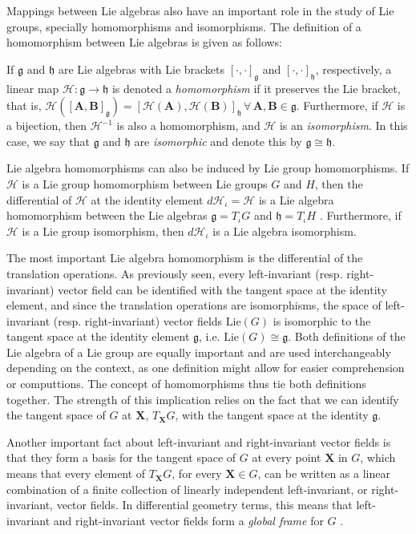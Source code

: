 Mappings between Lie algebras also have an important role in the study of Lie groups, specially homomorphisms and isomorphisms. The definition of a homomorphism between Lie algebras is given as follows:
\begin{definition}
    If $\mathfrak{g}$ and $\mathfrak{h}$ are Lie algebras with Lie brackets $[\cdot, \cdot]_\mathfrak{g}$ and $[\cdot, \cdot]_\mathfrak{h}$, respectively, a linear map $\mathscr{H}:\mathfrak{g}\to\mathfrak{h}$ is denoted a \emph{homomorphism} if it preserves the Lie bracket, that is, $\mathscr{H}([\mathbf{A}, \mathbf{B}]_\mathfrak{g}) = [\mathscr{H}(\mathbf{A}), \mathscr{H}(\mathbf{B})]_\mathfrak{h}\,\forall\, \mathbf{A},\mathbf{B}\in\mathfrak{g}$. Furthermore, if $\mathscr{H}$ is a bijection, then $\mathscr{H}^{-1}$ is also a homomorphism, and $\mathscr{H}$ is an \emph{isomorphism}. In this case, we say that $\mathfrak{g}$ and $\mathfrak{h}$ are \emph{isomorphic} and denote this by $\mathfrak{g}\cong\mathfrak{h}$.
\end{definition}
Lie algebra homomorphisms can also be induced by Lie group homomorphisms. If $\mathcal{H}$ is a Lie group homomorphism between Lie groups $G$ and $H$, then the differential of $\mathcal{H}$ at the identity element $d\mathcal{H}_\iota=\mathscr{H}$ is a Lie algebra homomorphism between the Lie algebras $\mathfrak{g}=T_\iota G$ and $\mathfrak{h}=T_\iota H$ \citep[p. 41]{Duistermaat2012}. Furthermore, if $\mathcal{H}$ is a Lie group isomorphism, then $d\mathcal{H}_\iota$ is a Lie algebra isomorphism.

The most important Lie algebra homomorphism is the differential of the translation operations. As previously seen, every left-invariant (resp. right-invariant) vector field can be identified with the tangent space at the identity element, and since the translation operations are isomorphisms, the space of left-invariant (resp. right-invariant) vector fields $\text{Lie}(G)$ is isomorphic to the tangent space at the identity element $\mathfrak{g}$, i.e. $\text{Lie}(G)\cong\mathfrak{g}$. Both definitions of the Lie algebra of a Lie group are equally important and are used interchangeably depending on the context, as one definition might allow for easier comprehension or computtions. The concept of homomorphisms thus tie both definitions together. The strength of this implication relies on the fact that we can identify the tangent space of $G$ at $\mathbf{X}$, $T_\mathbf{X}G$, with the tangent space at the identity $\mathfrak{g}$.

Another important fact about left-invariant and right-invariant vector fields is that they form a basis for the tangent space of $G$ at every point $\mathbf{X}$ in $G$, which means that every element of $T_\mathbf{X}G$, for every $\mathbf{X}\in G$, can be written as a linear combination of a finite collection of linearly independent left-invariant, or right-invariant, vector fields. In differential geometry terms, this means that left-invariant and right-invariant vector fields form a \emph{global frame} for $G$ \citep[p. 192]{Lee2012}.

